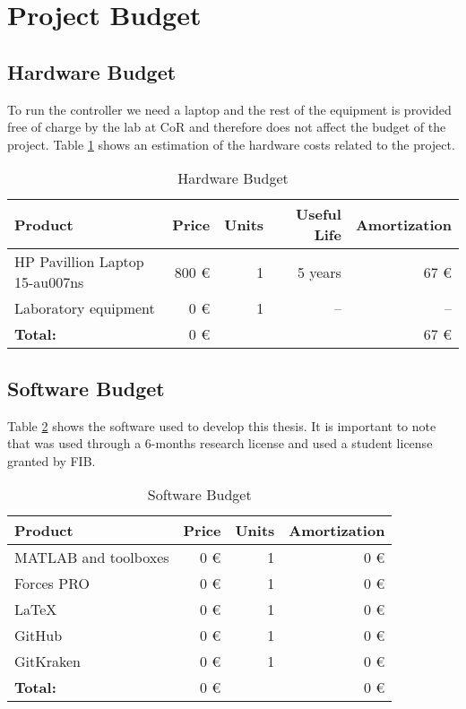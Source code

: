 \section{Project Budget}
\label{sec::budget}

\subsection{Hardware Budget}
To run the controller we need a laptop and the rest of the equipment is provided free of charge by the lab at \ac{CoR} and therefore does not affect the budget of the project.
Table \ref{budget::hardware} shows an estimation of the hardware costs related to the project. 

\begin{table}[H]
	\begin{center}
		\begin{tabular}{ |l|r|r|r|r| }
			\hline
			\bf Product & \bf Price & \bf Units  & \bf Useful Life & \bf Amortization \\\hline\hline
			HP Pavillion Laptop 15-au007ns & 800 \euro & 1  & 5 years & 67 \euro \\\hline  
			Laboratory equipment & 0 \euro & 1 & -- & -- \\\hline
			\bf Total:& 0 \euro & & & 67 \euro \\\hline
		\end{tabular}
		\caption{Hardware Budget}
		\label{budget::hardware}
	\end{center}
\end{table}

\subsection{Software Budget}
Table \ref{budget::software} shows the software used to develop this thesis. It is important to note that  was used through a 6-months research license and  used a student license granted by \ac{FIB}.

\begin{table}[H]
	\begin{center}
		\begin{tabular}{ |l|r|r|r| }
			\hline
			\bf Product & \bf Price & \bf Units & \bf Amortization \\\hline\hline
			MATLAB and toolboxes & 0 \euro & 1 & 0 \euro \\\hline
			Forces PRO & 0 \euro & 1 & 0 \euro \\\hline
			\LaTeX & 0 \euro & 1 & 0 \euro \\\hline
			GitHub & 0 \euro & 1 & 0 \euro \\\hline
			GitKraken & 0 \euro & 1 & 0 \euro \\\hline
			\bf Total:& 0 \euro & & 0 \euro \\\hline
		\end{tabular}
		\caption{Software Budget}
		\label{budget::software}
	\end{center}
\end{table}

